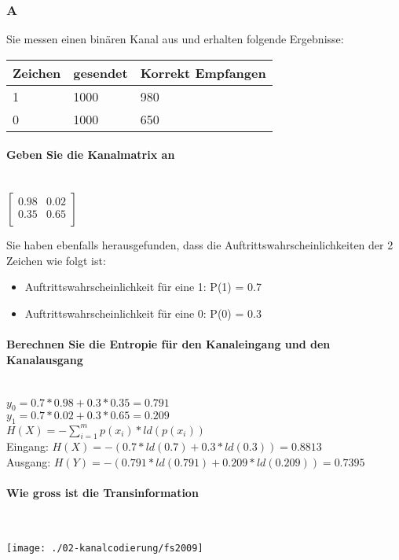 \subsubsection{A}
Sie messen einen binären Kanal aus und erhalten folgende Ergebnisse:\\

\begin{center}
    \centering
    \begin{tabular}{l | l | l}
        \bfseries{Zeichen} & \bfseries{gesendet}& \bfseries{Korrekt Empfangen}\\ \hline
        1 & 1000 & 980\\ 
        0 & 1000 & 650
    \end{tabular}
\end{center}

\paragraph{Geben Sie die Kanalmatrix an}\mbox{}\\

$\begin{bmatrix}
    0.98 & 0.02\\
    0.35 & 0.65\\
\end{bmatrix}$

Sie haben ebenfalls herausgefunden, dass die Auftrittswahrscheinlichkeiten der 2 Zeichen wie folgt ist:
\begin{itemize}
    \item Auftrittswahrscheinlichkeit für eine 1: P(1) = 0.7
    \item Auftrittswahrscheinlichkeit für eine 0: P(0) = 0.3
\end{itemize}

\paragraph{Berechnen Sie die Entropie für den Kanaleingang und den Kanalausgang}\mbox{}\\
$y_0=0.7*0.98+0.3*0.35=0.791$\\
$y_1=0.7*0.02+0.3*0.65=0.209$\\

$H(X)=-\sum_{i=1}^mp(x_i)*ld(p(x_i))$\\
Eingang: $H(X)=-(0.7*ld(0.7)+0.3*ld(0.3))=0.8813$\\
Ausgang: $H(Y)=-(0.791*ld(0.791)+0.209*ld(0.209))=0.7395$

\paragraph{Wie gross ist die Transinformation}\mbox{}\\
\begin{center}
    \vspace{-8pt}
    \texttt{[image: ./02-kanalcodierung/fs2009]}
    \vspace{-8pt}
\end{center}



